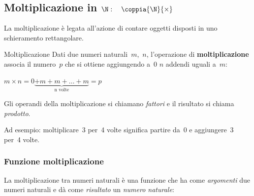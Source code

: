 \subsection{Moltiplicazione in 
\texorpdfstring{$\N: \quad \coppia{\N}{\times}$}{N: (N; x)}}

La moltiplicazione è legata all'azione di contare oggetti disposti in uno
schieramento rettangolare.

\begin{definizione}{Moltiplicazione}{}
Dati due numeri naturali~\(m\),~\(n\), l'operazione di 
\textbf{moltiplicazione} 
associa il numero~\(p\) che si ottiene aggiungendo a~0 \(n\) addendi 
uguali a~\(m\):

{\(m \times n = 0 \underbrace{+ m + m + \dots + m}_{\text{n volte}} = p\)}

Gli operandi della moltiplicazione si chiamano \emph{fattori} e il 
risultato si chiama \emph{prodotto}.
\end{definizione}

Ad esempio: moltiplicare~3 per~4 volte significa partire da~0 e 
aggiungere~3 per~4 volte.

\vspace{.5em}

\subsubsection{Funzione moltiplicazione}

La moltiplicazione tra numeri naturali è una funzione che ha come 
\emph{argomenti} due numeri naturali 
e dà come \emph{risultato} un \emph{numero naturale}:

\vspace{.5em}


